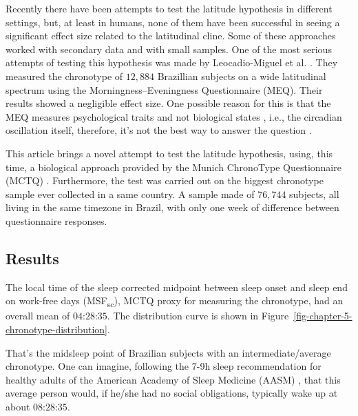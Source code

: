 \documentclass[
12pt,
openright,
oneside,
a4paper,
chapter=TITLE,
section=TITLE,
french,
spanish,
brazil,
english
]{abntex2}\usepackage{array}
\begin{document}
Recently there have been attempts to test the latitude hypothesis in
different settings, but, at least in humans, none of them have been
successful in seeing a significant effect size related to the
latitudinal cline. Some of these approaches worked with secondary data
and with small samples. One of the most serious attempts of testing this
hypothesis was made by Leocadio-Miguel et al.
\autocite*{leocadio-miguel2017}. They measured the chronotype of
\(12,884\) Brazillian subjects on a wide latitudinal spectrum using the
Morningness--Eveningness Questionnaire (MEQ). Their results showed a
negligible effect size. One possible reason for this is that the MEQ
measures psychological traits and not biological states
\autocite{roenneberg2019}, i.e., the circadian oscillation itself,
therefore, it's not the best way to answer the question
\autocite{leocadio-miguel2014}.

This article brings a novel attempt to test the latitude hypothesis,
using, this time, a biological approach provided by the Munich
ChronoType Questionnaire (MCTQ) \autocite{roenneberg2003}. Furthermore,
the test was carried out on the biggest chronotype sample ever collected
in a same country. A sample made of \(76,744\) subjects, all living in
the same timezone in Brazil, with only one week of difference between
questionnaire responses.

\subsection{Results}\label{results}

The local time of the sleep corrected midpoint between sleep onset and
sleep end on work-free days (MSF\textsubscript{sc}), MCTQ proxy for
measuring the chronotype, had an overall mean of \(\text{04:28:35}\).
The distribution curve is shown in
Figure~\ref{fig-chapter-5-chronotype-distribution}.

That's the midsleep point of Brazilian subjects with an
intermediate/average chronotype. One can imagine, following the 7-9h
sleep recommendation for healthy adults of the American Academy of Sleep
Medicine (AASM) \autocite{watson2015}, that this average person would,
if he/she had no social obligations, typically wake up at about
\(\text{08:28:35}\).
\end{document}
